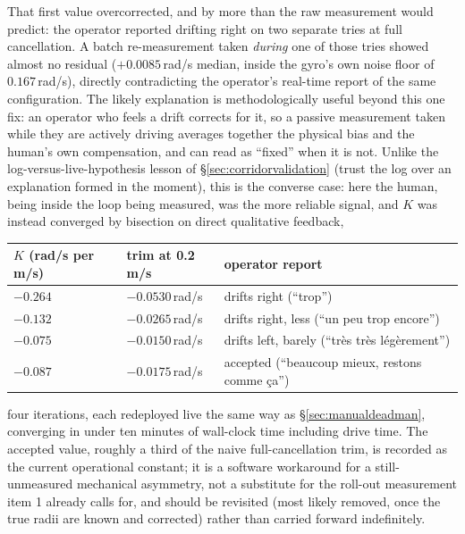 That first value overcorrected, and by more than the raw measurement would
predict: the operator reported drifting right on two separate tries at full
cancellation. A batch re-measurement taken \emph{during} one of those tries
showed almost no residual ($+0.0085$\,rad/s median, inside the gyro's own
noise floor of $0.167$\,rad/s), directly contradicting the operator's
real-time report of the same configuration. The likely explanation is
methodologically useful beyond this one fix: an operator who feels a drift
corrects for it, so a passive measurement taken while they are actively
driving averages together the physical bias and the human's own
compensation, and can read as ``fixed'' when it is not. Unlike the
log-versus-live-hypothesis lesson of \S\ref{sec:corridorvalidation} (trust
the log over an explanation formed in the moment), this is the converse
case: here the human, being inside the loop being measured, was the more
reliable signal, and $K$ was instead converged by bisection on direct
qualitative feedback,
\begin{center}
\begin{tabular}{@{}lll@{}}
\toprule
$K$ (rad/s per m/s) & trim at 0.2\,m/s & operator report \\
\midrule
$-0.264$ & $-0.0530$\,rad/s & drifts right (``trop'') \\
$-0.132$ & $-0.0265$\,rad/s & drifts right, less (``un peu trop encore'') \\
$-0.075$ & $-0.0150$\,rad/s & drifts left, barely (``très très légèrement'') \\
$-0.087$ & $-0.0175$\,rad/s & accepted (``beaucoup mieux, restons comme ça'') \\
\bottomrule
\end{tabular}
\end{center}
four iterations, each redeployed live the same way as
\S\ref{sec:manualdeadman}, converging in under ten minutes of wall-clock
time including drive time. The accepted value, roughly a third of the
naive full-cancellation trim, is recorded as the current operational
constant; it is a software workaround for a still-unmeasured mechanical
asymmetry, not a substitute for the roll-out measurement item 1 already
calls for, and should be revisited (most likely removed, once the true
radii are known and  corrected) rather than
carried forward indefinitely.

